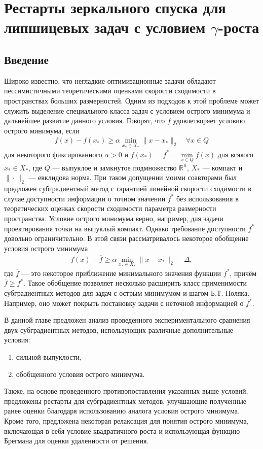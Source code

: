 \chapter{Рестарты зеркального спуска для липшицевых задач с условием $\gamma$-роста}\label{ch:ch3}

\section{Введение}\label{sec:ch3/sect1}

    Широко известно, что негладкие оптимизационные задачи обладают пессимистичными теоретическими оценками скорости сходимости в пространствах больших размерностей. Одним из подходов к этой проблеме может служить выделение специального класса задач с условием острого минимума \cite{6, 1} и дальнейшее развитие данного условия. Говорят, что $f$ удовлетворяет условию острого минимума, если
    \begin{gather}\label{sm}
    f(x) - f(x_*) \geq \alpha \min_{x_* \in X_*} \|x- x_*\|_2 \quad \forall x \in Q
    \end{gather}
    для некоторого фиксированного $\alpha >0$ и $f(x_*) = f^* = \min\limits_{x\in Q} f(x)$ для всякого $x_* \in X_*$, где $Q$ --- выпуклое и замкнутое подмножество $\mathbb{R}^n$, $X_*$ --- компакт и $\|\cdot\|_2$ --- евклидова норма. 
    При таком допущении моими соавторами был предложен субградиентный метод с гарантией  линейной скорости сходимости в случае доступности информации о точном значении $f^*$ \cite{6} без использования в теоретических оценках скорости сходимости  параметра размерности пространства. Условие острого минимума верно, например, для задачи проектирования точки на выпуклый компакт. Однако требование доступности $f^*$ довольно ограничительно. В этой связи рассматривалось некоторое обобщение условия острого минимума
    \begin{gather}\label{eq_gen_sharp}
    f(x) - \overline{f} \geq \alpha \min_{x_* \in X_*} \|x - x_* \|_2 - \Delta,
    \end{gather}
    где $\overline{f}$  --- это некоторое приближение минимального значения функции $f^*$, причём $\overline{f} \geq f^*$. Такое обобщение позволяет несколько расширить класс применимости субградиентных методов для задач с острым минимумом и шагом Б.Т. Поляка. Например, оно может покрыть постановку задачи с неточной информацией о $f^*$.  

    В данной главе предложен анализ проведенного экспериментального сравнения двух субградиентных методов, использующих различные дополнительные условия:
    \begin{enumerate}
        \item сильной выпуклости,
        \item обобщенного условия острого минимума.
    \end{enumerate}
    Также, на основе проведенного противопоставления указанных выше условий, предложены рестарты для субградиентных методов, улучшающие полученные ранее оценки благодаря использованию аналога условия острого минимума.  Кроме того, предложена некоторая релаксация для понятия острого минимума, включающая в себя условие квадратичного роста и использующая функцию Брегмана для оценки удаленности от решения. 

